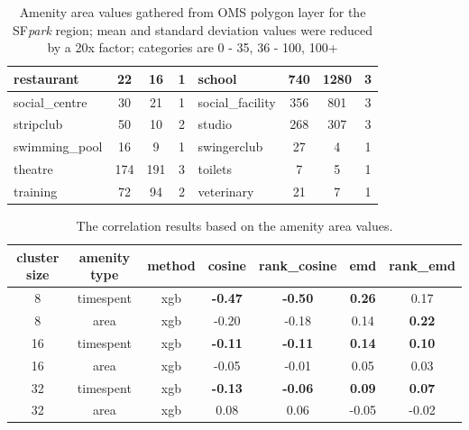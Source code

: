 {\begin{table}[!ht]
{\begin{tabular}{ | l | c | c | c || l | c | c | c |}
		restaurant & 22 & 16 & 1 & school & 740 & 1280 & 3 \\ \hline
		social\_centre & 30 & 21 & 1 & social\_facility & 356 & 801 & 3 \\ \hline
		stripclub & 50 & 10 & 2 & studio & 268 & 307 & 3 \\ \hline
		swimming\_pool & 16 & 9 & 1 & swingerclub & 27 & 4 & 1 \\ \hline
		theatre & 174 & 191 & 3 & toilets & 7 & 5 & 1 \\ \hline
		training & 72 & 94 & 2 & veterinary & 21 & 7 & 1 \\ \hline
	\end{tabular}
	\caption{\color{green} Amenity area values gathered from OMS polygon layer for the SF\textit{park} region; mean and standard deviation values were reduced by a 20x factor; categories are 0 - 35, 36 - 100, 100+}
	\label{extensions:amenity_area_values}}
\end{table}

\begin{table}[!ht]
	{\color{green}
	\centering
	\small
	\begin{tabular}{ | c | c | c | c | c | c | c | }
		\hline
		{cluster size} & {amenity type} & method & cosine & rank\_cosine & emd & rank\_emd \\ \hline
		8 & timespent & xgb & \textbf{-0.47} & \textbf{-0.50} & \textbf{0.26} & 0.17 \\ \hline
		8 & area & xgb & -0.20 & -0.18 & 0.14 & \textbf{0.22} \\ \hline \hline
		16 & timespent & xgb & \textbf{-0.11} & \textbf{-0.11} & \textbf{0.14} & \textbf{0.10} \\ \hline
		16 & area & xgb & -0.05 & -0.01 & 0.05 & 0.03 \\ \hline \hline
		32 & timespent & xgb & \textbf{-0.13} & \textbf{-0.06} & \textbf{0.09} & \textbf{0.07} \\ \hline
		32 & area & xgb & 0.08 & 0.06 & -0.05 & -0.02 \\ \hline \hline
	\end{tabular}%
	\caption{\color{green} The correlation results based on the amenity area values.}
	\label{extensions:correlation_amenity_area}}
\end{table}

}
